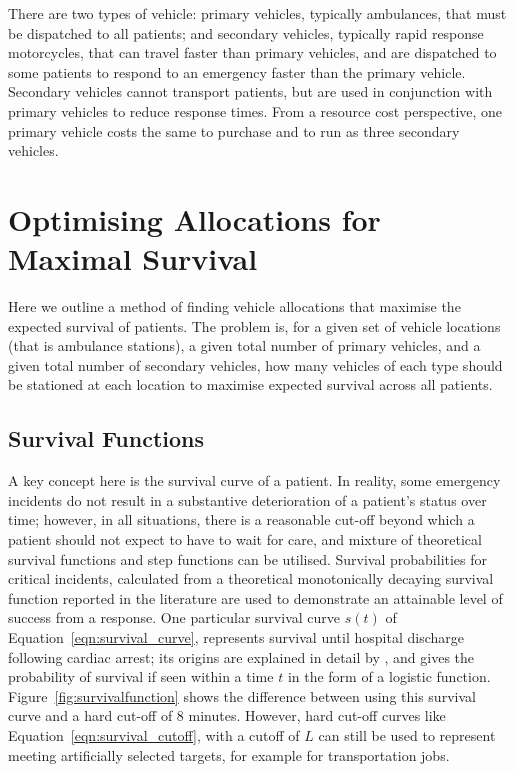 \documentclass[numbers,webpdf,imaman]{ima-authoring-template}%
\begin{document}
There are two types of vehicle: primary vehicles, typically ambulances, that
must be dispatched to all patients; and secondary vehicles, typically rapid
response motorcycles, that can travel faster than primary vehicles, and are
dispatched to some patients to respond to an emergency faster than the primary
vehicle. Secondary vehicles cannot transport patients, but are used in
conjunction with primary vehicles to reduce response times.
From a resource cost perspective, one primary vehicle costs the same to purchase
and to run as three secondary vehicles.


\section{Optimising Allocations for Maximal Survival}\label{sec:optimising}
Here we outline a method of finding vehicle allocations that maximise the
expected survival of patients.
The problem is, for a given set of vehicle locations (that is ambulance
stations), a given total number of primary vehicles, and a given total number
of secondary vehicles, how many vehicles of each type should be stationed at
each location to maximise expected survival across all patients.


\subsection{Survival Functions}\label{sec:survival}
A key concept here is the survival curve of a patient.
In reality, some emergency incidents do not result in a substantive
deterioration of a patient’s status over time; however, in all situations,
there is a reasonable cut-off beyond which a patient should not expect to have
to wait for care, and mixture of theoretical survival functions and step
functions can be utilised.
Survival probabilities for critical incidents, calculated from a theoretical
monotonically decaying survival function reported in the literature
\citep{Valenzuela20001206} are used to demonstrate an attainable level of
success from a response. One particular survival curve $s(t)$ of
Equation~\ref{eqn:survival_curve}, represents survival until hospital
discharge following cardiac arrest; its origins are explained in detail by
\citet{Knight2012918}, and gives the probability of survival if seen within a
time $t$ in the form of a logistic function. Figure~\ref{fig:survivalfunction}
shows the difference between using this survival curve and a hard cut-off of 8
minutes.
However, hard cut-off curves like Equation~\ref{eqn:survival_cutoff}, with a
cutoff of $L$ can still be used to represent meeting artificially selected
targets, for example for transportation jobs.
\end{document}
